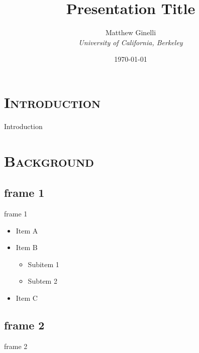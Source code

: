 \documentclass[xcolor=x11names,compress]{beamer}
\renewcommand{\(}{\begin{columns}}
\renewcommand{\)}{\end{columns}}
\newcommand{\<}[1]{\begin{column}{#1}}
\renewcommand{\>}{\end{column}}
\begin{document}
\section{\scshape Introduction}
\begin{frame}
\title{Presentation Title}
\author{
	Matthew Ginelli\\
	{\it University of California, Berkeley}\\
}
\date{
	\today
}
\titlepage
\end{frame}

\begin{frame}{Introduction}
\tableofcontents
\end{frame}

\section{\scshape Background}
\subsection{frame 1}
\begin{frame}{frame 1}
\begin{itemize}
\item Item A
\item Item B
\begin{itemize}
\item Subitem 1
\item Subtem 2
\end{itemize}
\item Item C
\end{itemize}
\end{frame}

\subsection{frame 2}
\begin{frame}{frame 2}

\end{frame}

\end{document}
